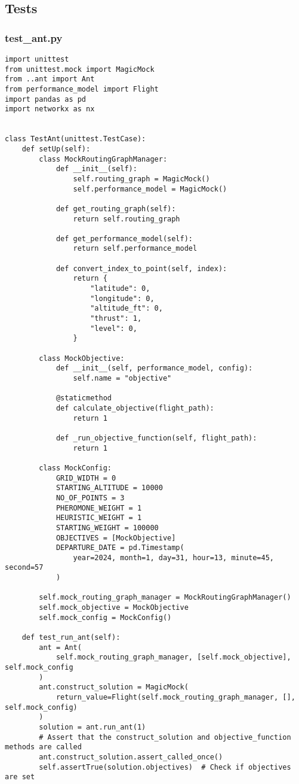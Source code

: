 \subsection{Tests}
\subsubsection{test_ant.py}
\begin{verbatim}
import unittest
from unittest.mock import MagicMock
from ..ant import Ant
from performance_model import Flight
import pandas as pd
import networkx as nx


class TestAnt(unittest.TestCase):
    def setUp(self):
        class MockRoutingGraphManager:
            def __init__(self):
                self.routing_graph = MagicMock()
                self.performance_model = MagicMock()

            def get_routing_graph(self):
                return self.routing_graph

            def get_performance_model(self):
                return self.performance_model

            def convert_index_to_point(self, index):
                return {
                    "latitude": 0,
                    "longitude": 0,
                    "altitude_ft": 0,
                    "thrust": 1,
                    "level": 0,
                }

        class MockObjective:
            def __init__(self, performance_model, config):
                self.name = "objective"

            @staticmethod
            def calculate_objective(flight_path):
                return 1

            def _run_objective_function(self, flight_path):
                return 1

        class MockConfig:
            GRID_WIDTH = 0
            STARTING_ALTITUDE = 10000
            NO_OF_POINTS = 3
            PHEROMONE_WEIGHT = 1
            HEURISTIC_WEIGHT = 1
            STARTING_WEIGHT = 100000
            OBJECTIVES = [MockObjective]
            DEPARTURE_DATE = pd.Timestamp(
                year=2024, month=1, day=31, hour=13, minute=45, second=57
            )

        self.mock_routing_graph_manager = MockRoutingGraphManager()
        self.mock_objective = MockObjective
        self.mock_config = MockConfig()

    def test_run_ant(self):
        ant = Ant(
            self.mock_routing_graph_manager, [self.mock_objective], self.mock_config
        )
        ant.construct_solution = MagicMock(
            return_value=Flight(self.mock_routing_graph_manager, [], self.mock_config)
        )
        solution = ant.run_ant(1)
        # Assert that the construct_solution and objective_function methods are called
        ant.construct_solution.assert_called_once()
        self.assertTrue(solution.objectives)  # Check if objectives are set


\end{verbatim}
